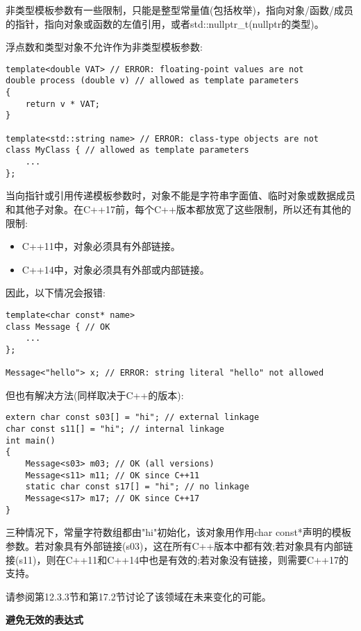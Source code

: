 非类型模板参数有一些限制，只能是整型常量值(包括枚举)，指向对象/函数/成员的指针，指向对象或函数的左值引用，或者std::nullptr\_t(nullptr的类型)。

浮点数和类型对象不允许作为非类型模板参数:

\begin{lstlisting}[style=styleCXX]
template<double VAT> // ERROR: floating-point values are not
double process (double v) // allowed as template parameters
{
	return v * VAT;
}

template<std::string name> // ERROR: class-type objects are not
class MyClass { // allowed as template parameters
	...
};
\end{lstlisting}

当向指针或引用传递模板参数时，对象不能是字符串字面值、临时对象或数据成员和其他子对象。在C++17前，每个C++版本都放宽了这些限制，所以还有其他的限制:

\begin{itemize}
\item 
C++11中，对象必须具有外部链接。

\item 
C++14中，对象必须具有外部或内部链接。
\end{itemize}

因此，以下情况会报错:

\begin{lstlisting}[style=styleCXX]
template<char const* name>
class Message { // OK
	...
};

Message<"hello"> x; // ERROR: string literal "hello" not allowed
\end{lstlisting}

但也有解决方法(同样取决于C++的版本):

\begin{lstlisting}[style=styleCXX]
extern char const s03[] = "hi"; // external linkage
char const s11[] = "hi"; // internal linkage
int main()
{
	Message<s03> m03; // OK (all versions)
	Message<s11> m11; // OK since C++11
	static char const s17[] = "hi"; // no linkage
	Message<s17> m17; // OK since C++17
}
\end{lstlisting}

三种情况下，常量字符数组都由"hi"初始化，该对象用作用char const*声明的模板参数。若对象具有外部链接(s03)，这在所有C++版本中都有效;若对象具有内部链接(s11)，则在C++11和C++14中也是有效的;若对象没有链接，则需要C++17的支持。

请参阅第12.3.3节和第17.2节讨论了该领域在未来变化的可能。

\noindent
\textbf{避免无效的表达式}


